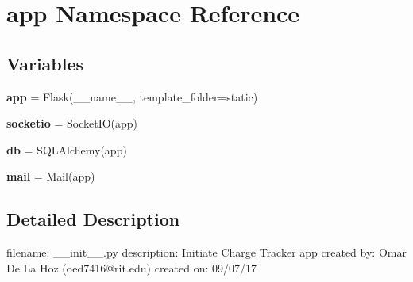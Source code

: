 \hypertarget{namespaceapp}{}\section{app Namespace Reference}
\label{namespaceapp}
\subsection*{Variables}
\begin{DoxyCompactItemize}
\item 
\mbox{\label{namespaceapp_a675b4ea702c13dc4b8c05f985a25b496}} 
{\bfseries app} = Flask(\+\_\+\+\_\+name\+\_\+\+\_\+, template\+\_\+folder=\textquotesingle{}static\textquotesingle{})
\item 
\mbox{\label{namespaceapp_a5e96f78557153399b3460b769e9bfeac}} 
{\bfseries socketio} = Socket\+IO(app)
\item 
\mbox{\label{namespaceapp_a75341a4bc0e8e239f299316136af3466}} 
{\bfseries db} = S\+Q\+L\+Alchemy(app)
\item 
\mbox{\label{namespaceapp_a476241c29a05353b264621894d7c23bb}} 
{\bfseries mail} = Mail(app)
\end{DoxyCompactItemize}


\subsection{Detailed Description}
\begin{DoxyVerb}filename: __init__.py
description: Initiate Charge Tracker app
created by: Omar De La Hoz (oed7416@rit.edu)
created on: 09/07/17
\end{DoxyVerb}
 